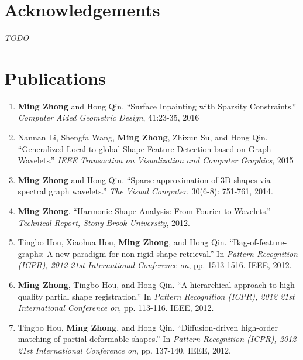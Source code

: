 \documentclass[12pt,letterpaper,twosided]{report}
\numberwithin{equation}{section}
\begin{document}
\chapter*{Acknowledgements}
\emph{TODO}

\newpage
\chapter*{Publications}

\begin{enumerate}
\item \textbf{Ming Zhong} and Hong Qin. ``Surface Inpainting with Sparsity Constraints.'' \emph{Computer Aided Geometric Design}, 41:23-35, 2016
\item Nannan Li, Shengfa Wang, \textbf{Ming Zhong}, Zhixun Su, and Hong Qin. ``Generalized Local-to-global Shape Feature Detection based on Graph Wavelets.'' \emph{IEEE Transaction on Visualization and Computer Graphics}, 2015
\item \textbf{Ming Zhong} and Hong Qin. ``Sparse approximation of 3D shapes via spectral graph wavelets.'' \emph{The Visual Computer}, 30(6-8): 751-761, 2014.
\item \textbf{Ming Zhong}. ``Harmonic Shape Analysis: From Fourier to Wavelets.'' \emph{Technical Report, Stony Brook University}, 2012.
\item Tingbo Hou, Xiaohua Hou, \textbf{Ming Zhong}, and Hong Qin. ``Bag-of-feature-graphs: A new paradigm for non-rigid shape retrieval.'' In \emph{Pattern Recognition (ICPR), 2012 21st International Conference on}, pp. 1513-1516. IEEE, 2012.
\item \textbf{Ming Zhong}, Tingbo Hou, and Hong Qin. ``A hierarchical approach to high-quality partial shape registration.'' In \emph{Pattern Recognition (ICPR), 2012 21st International Conference on}, pp. 113-116. IEEE, 2012.
\item Tingbo Hou, \textbf{Ming Zhong}, and Hong Qin. ``Diffusion-driven high-order matching of partial deformable shapes.'' In \emph{Pattern Recognition (ICPR), 2012 21st International Conference on}, pp. 137-140. IEEE, 2012.
\end{enumerate}

\newpage
\pagestyle{fancy}
\fancyhead{}
\fancyhead[RO,LE]{\thepage}
\fancyhead[LO]{\leftmark}
\fancyhead[RE]{\rightmark}
\fancyfoot{}
\renewcommand{\headrulewidth}{0.5pt}

\graphicspath{{fig-intro/}}

\graphicspath{{figures/}}

\graphicspath{{fig-approximation/}}

\graphicspath{{fig-inpainting/}}

\graphicspath{{fig-feature/}}

\graphicspath{{figures/}}




{}


\end{document}
